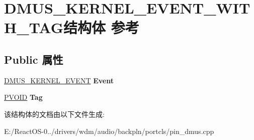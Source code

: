\hypertarget{struct_d_m_u_s___k_e_r_n_e_l___e_v_e_n_t___w_i_t_h___t_a_g}{}\section{D\+M\+U\+S\+\_\+\+K\+E\+R\+N\+E\+L\+\_\+\+E\+V\+E\+N\+T\+\_\+\+W\+I\+T\+H\+\_\+\+T\+A\+G结构体 参考}
\label{struct_d_m_u_s___k_e_r_n_e_l___e_v_e_n_t___w_i_t_h___t_a_g}
\subsection*{Public 属性}
\begin{DoxyCompactItemize}
\item 
\mbox{\label{struct_d_m_u_s___k_e_r_n_e_l___e_v_e_n_t___w_i_t_h___t_a_g_a661618b1ae9435b1204f4ad7b5f08fd1}} 
\hyperlink{struct___d_m_u_s___k_e_r_n_e_l___e_v_e_n_t}{D\+M\+U\+S\+\_\+\+K\+E\+R\+N\+E\+L\+\_\+\+E\+V\+E\+NT} {\bfseries Event}
\item 
\mbox{\label{struct_d_m_u_s___k_e_r_n_e_l___e_v_e_n_t___w_i_t_h___t_a_g_a34d848c489e565dc06513983930a89ed}} 
\hyperlink{interfacevoid}{P\+V\+O\+ID} {\bfseries Tag}
\end{DoxyCompactItemize}


该结构体的文档由以下文件生成\+:\begin{DoxyCompactItemize}
\item 
E\+:/\+React\+O\+S-\/0../drivers/wdm/audio/backpln/portcls/pin\+\_\+dmus.\+cpp\end{DoxyCompactItemize}
